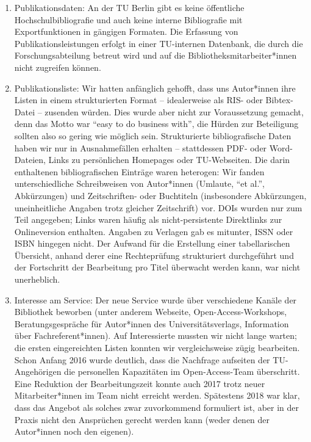 \documentclass[a4paper,
fontsize=11pt,
oneside,
numbers=noperiodatend,
parskip=half-,
bibliography=totoc,
final
]{scrartcl}
\begin{document}
\begin{enumerate}
\def\labelenumi{\arabic{enumi}.}
\item
  Publikationsdaten: An der TU Berlin gibt es keine öffentliche
  Hochschulbibliografie und auch keine interne Bibliografie mit
  Exportfunktionen in gängigen Formaten. Die Erfassung von
  Publikationsleistungen erfolgt in einer TU-internen Datenbank, die
  durch die Forschungsabteilung betreut wird und auf die
  Bibliotheksmitarbeiter*innen nicht zugreifen können.
\item
  Publikationsliste: Wir hatten anfänglich gehofft, dass uns Autor*innen
  ihre Listen in einem strukturierten Format -- idealerweise als RIS-
  oder Bibtex-Datei -- zusenden würden. Dies wurde aber nicht zur
  Voraussetzung gemacht, denn das Motto war \enquote{easy to do business
  with}, die Hürden zur Beteiligung sollten also so gering wie möglich
  sein. Strukturierte bibliografische Daten haben wir nur in
  Ausnahmefällen erhalten -- stattdessen PDF- oder Word-Dateien, Links
  zu persönlichen Homepages oder TU-Webseiten. Die darin enthaltenen
  bibliografischen Einträge waren heterogen: Wir fanden unterschiedliche
  Schreibweisen von Autor*innen (Umlaute, \enquote{et al.}, Abkürzungen)
  und Zeitschriften- oder Buchtiteln (insbesondere Abkürzungen,
  uneinheitliche Angaben trotz gleicher Zeitschrift) vor. DOIs wurden
  nur zum Teil angegeben; Links waren häufig als nicht-persistente
  Direktlinks zur Onlineversion enthalten. Angaben zu Verlagen gab es
  mitunter, ISSN oder ISBN hingegen nicht. Der Aufwand für die
  Erstellung einer tabellarischen Übersicht, anhand derer eine
  Rechteprüfung strukturiert durchgeführt und der Fortschritt der
  Bearbeitung pro Titel überwacht werden kann, war nicht unerheblich.
\item
  Interesse am Service: Der neue Service wurde über verschiedene Kanäle
  der Bibliothek beworben (unter anderem Webseite,
  Open-Access-Workshops, Beratungsgespräche für Autor*innen des
  Universitätsverlags, Information über Fachreferent*innen). Auf
  Interessierte mussten wir nicht lange warten; die ersten eingereichten
  Listen konnten wir vergleichsweise zügig bearbeiten. Schon Anfang 2016
  wurde deutlich, dass die Nachfrage aufseiten der TU-Angehörigen die
  personellen Kapazitäten im Open-Access-Team überschritt. Eine
  Reduktion der Bearbeitungszeit konnte auch 2017 trotz neuer
  Mitarbeiter*innen im Team nicht erreicht werden. Spätestens 2018 war
  klar, dass das Angebot als solches zwar zuvorkommend formuliert ist,
  aber in der Praxis nicht den Ansprüchen gerecht werden kann (weder
  denen der Autor*innen noch den eigenen).
\end{enumerate}
\end{document}
